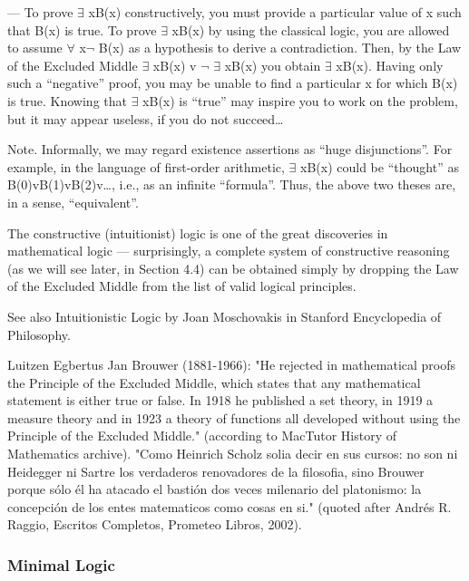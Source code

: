 --- To prove \(\exists\) xB(x) constructively, you must provide a particular value of x such that B(x) is true. To prove \(\exists\) xB(x) by using the classical logic, you are allowed to assume \(\forall\) x\(\neg\) B(x) as a hypothesis to derive a contradiction. Then, by the Law of the Excluded Middle \(\exists\) xB(x) v \(\neg\) \(\exists\) xB(x) you obtain \(\exists\) xB(x). Having only such a ``negative'' proof, you may be unable to find a particular x for which B(x) is true. Knowing that \(\exists\) xB(x) is ``true'' may inspire you to work on the problem, but it may appear useless, if you do not succeed\ldots

\begin{note}
Note. Informally, we may regard existence assertions as ``huge disjunctions''. For example, in the language of first-order arithmetic, \(\exists\) xB(x) could be ``thought'' as B(0)vB(1)vB(2)v\ldots , i.e., as an infinite ``formula''. Thus, the above two theses are, in a sense, ``equivalent''.
\end{note}

The constructive (intuitionist) logic is one of the great discoveries in mathematical logic --- surprisingly, a complete system of constructive reasoning (as we will see later, in Section 4.4) can be obtained simply by dropping the Law of the Excluded Middle from the list of valid logical principles.

See also Intuitionistic Logic by Joan Moschovakis in Stanford Encyclopedia of Philosophy.

Luitzen Egbertus Jan Brouwer (1881-1966): "He rejected in mathematical proofs the Principle of the Excluded Middle, which states that any mathematical statement is either true or false. In 1918 he published a set theory, in 1919 a measure theory and in 1923 a theory of functions all developed without using the Principle of the Excluded Middle." (according to MacTutor History of Mathematics archive). "Como Heinrich Scholz solia decir en sus cursos: no son ni Heidegger ni Sartre los verdaderos renovadores de la filosofia, sino Brouwer porque sólo él ha atacado el bastión dos veces milenario del platonismo: la concepción de los entes matematicos como cosas en si." (quoted after Andrés R. Raggio, Escritos Completos, Prometeo Libros, 2002).

\subsubsection{Minimal Logic}

